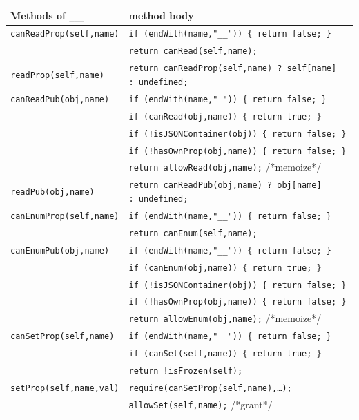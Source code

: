 \documentclass[letterpaper,twocolumn,10pt]{article}
\newcommand{\code}[1]{{\tt {#1}}}              %
\begin{document}
\begin{table}
\begin{tabular}{ll}
  Methods of \code{\_\_\_}  & method body \\ 
  \hline 
  \code{canReadProp(self,name)}
       & \code{if (endWith(name,"\_\_"))\ \{ return false; \}} \\
       & \code{return canRead(self,name);} \\
  \code{readProp(self,name)}
       & \code{return canReadProp(self,name) ?\ self[name] :\ undefined;} \\
  \code{canReadPub(obj,name)}
       & \code{if (endWith(name,"\_"))\ \{ return false; \}} \\
       & \code{if (canRead(obj,name))\ \{ return true; \}} \\
       & \code{if (!isJSONContainer(obj))\ \{ return false; \}} \\
       & \code{if (!hasOwnProp(obj,name))\ \{ return false; \}} \\
       & \code{return allowRead(obj,name);} /*memoize*/ \\
  \code{readPub(obj,name)}
       & \code{return canReadPub(obj,name) ?\ obj[name] :\ undefined;} \\
  \hline
  \code{canEnumProp(self,name)} 
       & \code{if (endWith(name,"\_\_"))\ \{ return false; \}} \\
       & \code{return canEnum(self,name);} \\
  \code{canEnumPub(obj,name)}
       & \code{if (endWith(name,"\_\_"))\ \{ return false; \}} \\
       & \code{if (canEnum(obj,name))\ \{ return true; \}} \\
       & \code{if (!isJSONContainer(obj))\ \{ return false; \}} \\
       & \code{if (!hasOwnProp(obj,name))\ \{ return false; \}} \\
       & \code{return allowEnum(obj,name);} /*memoize*/ \\
  \hline
  \code{canSetProp(self,name)}
       & \code{if (endWith(name,"\_\_"))\ \{ return false; \}} \\
       & \code{if (canSet(self,name))\ \{ return true; \}} \\
       & \code{return !isFrozen(self);} \\
  \code{setProp(self,name,val)}
       & \code{require(canSetProp(self,name),\ldots);} \\
       & \code{allowSet(self,name);} /*grant*/ \\

\end{tabular}
\end{table}
\end{document}
